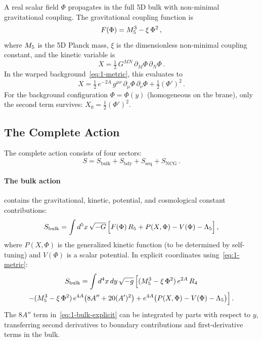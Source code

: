 A real scalar field $\Phi$ propagates in the full 5D bulk with non-minimal gravitational coupling. The gravitational coupling function is
\begin{equation}
\label{eq:1-coupling}
F(\Phi) = M_5^3 - \xi\,\Phi^2\,,
\end{equation}
where $M_5$ is the 5D Planck mass, $\xi$ is the dimensionless non-minimal coupling constant, and the kinetic variable is
\begin{equation}
\label{eq:1-kinetic-var}
X = \tfrac{1}{2}\, G^{MN}\, \partial_M \Phi\, \partial_N \Phi\,.
\end{equation}
In the warped background~\eqref{eq:1-metric}, this evaluates to
\begin{equation}
\label{eq:1-kinetic-warped}
X = \tfrac{1}{2}\, e^{-2A}\, g^{\mu\nu}\, \partial_\mu \Phi\, \partial_\nu \Phi + \tfrac{1}{2}(\Phi')^2\,.
\end{equation}
For the background configuration $\Phi = \Phi(y)$ (homogeneous on the brane), only the second term survives: $X_0 = \tfrac{1}{2}(\Phi')^2$.

\subsection{The Complete Action}
\label{sec:1-action}

The complete action consists of four sectors:
\begin{equation}
\label{eq:1-total-action}
S = S_{\mathrm{bulk}} + S_{\mathrm{bdy}} + S_{\mathrm{seq}} + S_{\mathrm{NCG}}\,.
\end{equation}

\paragraph{The bulk action} contains the gravitational, kinetic, potential, and cosmological constant contributions:
\begin{equation}
\label{eq:1-bulk-action}
S_{\mathrm{bulk}} = \int d^5x\, \sqrt{-G}\, \Bigl[F(\Phi)\, R_5 + P(X, \Phi) - V(\Phi) - \Lambda_5\Bigr]\,,
\end{equation}
where $P(X, \Phi)$ is the generalized kinetic function (to be determined by self-tuning) and $V(\Phi)$ is a scalar potential. In explicit coordinates using~\eqref{eq:1-metric}:
\begin{multline}
\label{eq:1-bulk-explicit}
S_{\mathrm{bulk}} = \int d^4x\, dy\, \sqrt{-g}\, \Bigl[(M_5^3 - \xi\,\Phi^2)\, e^{2A}\, R_4 \\
- (M_5^3 - \xi\,\Phi^2)\, e^{4A}\bigl(8A'' + 20(A')^2\bigr) + e^{4A}\bigl(P(X,\Phi) - V(\Phi) - \Lambda_5\bigr)\Bigr]\,.
\end{multline}
The $8A''$ term in~\eqref{eq:1-bulk-explicit} can be integrated by parts with respect to $y$, transferring second derivatives to boundary contributions and first-derivative terms in the bulk.

